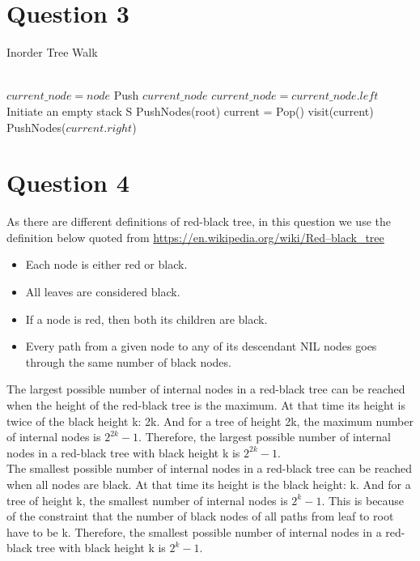 \documentclass[11pt]{article}
\begin{document}
\section{Question 3}
\begin{algorithm}
\caption{Inorder Tree Walk}
\begin{algorithmic}[1]
\\
	\State $current\_node = node$
		\State Push $current\_node$
		\State $current\_node = current\_node.left$
	\EndWhile
\EndProcedure
\\
	\State \Return
\EndIf
\State Initiate an empty stack S
\State PushNodes(root)
\State current = Pop()
\State visit(current)
	\State PushNodes($current.right $)
\EndIf
\EndWhile
\EndProcedure
\end{algorithmic}
\end{algorithm}
\newpage
\section{Question 4}
As there are different definitions of red-black tree, in this question we use the definition below quoted from \url{https://en.wikipedia.org/wiki/Red–black_tree}
\begin{itemize}
\item Each node is either red or black.
\item All leaves are considered black.
\item If a node is red, then both its children are black.
\item Every path from a given node to any of its descendant NIL nodes goes through the same number of black nodes.
\end{itemize}
The largest possible number of internal nodes in a red-black tree can be reached when the height of the red-black tree is the maximum. At that time its height is twice of the black height k: 2k. And for a tree of height 2k, the maximum number of internal nodes is $2^{2k}-1$. Therefore, the largest possible number of internal nodes in a red-black tree with black height k is $2^{2k}-1$.\\

\noindent
The smallest possible number of internal nodes in a red-black tree can be reached when all nodes are black. At that time its height is the black height: k.  And for a tree of height k, the smallest number of internal nodes is $2^{k}-1$. This is because of the constraint that the number of black nodes of all paths from leaf to root have to be k. Therefore, the smallest possible number of internal nodes in a red-black tree with black height k is $2^{k}-1$.
\end{document}

